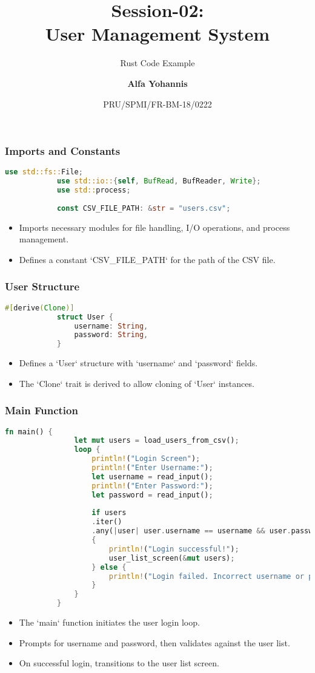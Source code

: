 \documentclass[aspectratio=169, table]{beamer}
\subtitle{Rust Code Example}
\title{\LARGE{Session-02:\\User Management System}
	\vspace{20pt}}
\date[Serial]{\scriptsize {PRU/SPMI/FR-BM-18/0222}}
\author[Pradita]{\small{\textbf{Alfa Yohannis}}}
\begin{document}
	
	\frame{\titlepage}
	
	\begin{frame}[fragile]
		\frametitle{Imports and Constants}
		\begin{lstlisting}[language=Rust]
			use std::fs::File;
			use std::io::{self, BufRead, BufReader, Write};
			use std::process;
			
			const CSV_FILE_PATH: &str = "users.csv";
		\end{lstlisting}
		\begin{itemize}
			\item Imports necessary modules for file handling, I/O operations, and process management.
			\item Defines a constant `CSV\_FILE\_PATH` for the path of the CSV file.
		\end{itemize}
	\end{frame}
	
	\begin{frame}[fragile]
		\frametitle{User Structure}
		\begin{lstlisting}[language=Rust]
			#[derive(Clone)]
			struct User {
				username: String,
				password: String,
			}
		\end{lstlisting}
		\begin{itemize}
			\item Defines a `User` structure with `username` and `password` fields.
			\item The `Clone` trait is derived to allow cloning of `User` instances.
		\end{itemize}
	\end{frame}
	
	\begin{frame}[fragile]
		\frametitle{Main Function}
		\begin{lstlisting}[language=Rust]
			fn main() {
				let mut users = load_users_from_csv();
				loop {
					println!("Login Screen");
					println!("Enter Username:");
					let username = read_input();
					println!("Enter Password:");
					let password = read_input();
					
					if users
					.iter()
					.any(|user| user.username == username && user.password == password)
					{
						println!("Login successful!");
						user_list_screen(&mut users);
					} else {
						println!("Login failed. Incorrect username or password.");
					}
				}
			}
		\end{lstlisting}
		\begin{itemize}
			\item The `main` function initiates the user login loop.
			\item Prompts for username and password, then validates against the user list.
			\item On successful login, transitions to the user list screen.
		\end{itemize}
	\end{frame}
	
\end{document}
